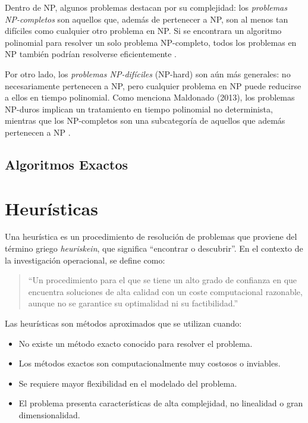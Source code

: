 \documentclass[12pt,titlepage,twoside,openright]{book}
\begin{document}
Dentro de NP, algunos problemas destacan por su complejidad: los \textit{problemas NP-completos} son aquellos que, además de pertenecer a NP, son al menos tan difíciles como cualquier otro problema en NP. Si se encontrara un algoritmo polinomial para resolver un solo problema NP-completo, todos los problemas en NP también podrían resolverse eficientemente \citep{garey1979computers}.

Por otro lado, los \textit{problemas NP-difíciles} (NP-hard) son aún más generales: no necesariamente pertenecen a NP, pero cualquier problema en NP puede reducirse a ellos en tiempo polinomial. Como menciona Maldonado (2013), los problemas NP-duros implican un tratamiento en tiempo polinomial no determinista, mientras que los NP-completos son una subcategoría de aquellos que además pertenecen a NP \citep{maldonado2013problema}.


\subsection{Algoritmos Exactos}

\section{Heurísticas}

Una heurística es un procedimiento de resolución de problemas que proviene del término griego \textit{heuriskein}, que significa ``encontrar o descubrir''. En el contexto de la investigación operacional, se define como:

\begin{quote}
    ``Un procedimiento para el que se tiene un alto grado de confianza en que encuentra soluciones de alta calidad con un coste computacional razonable, aunque no se garantice su optimalidad ni su factibilidad.'' \citep{antonioSuarez2014}
\end{quote}


Las heurísticas son métodos aproximados que se utilizan cuando:

\begin{itemize}
    \item No existe un método exacto conocido para resolver el problema.
    \item Los métodos exactos son computacionalmente muy costosos o inviables.
    \item Se requiere mayor flexibilidad en el modelado del problema.
    \item El problema presenta características de alta complejidad, no linealidad o gran dimensionalidad.
\end{itemize}
\end{document}
